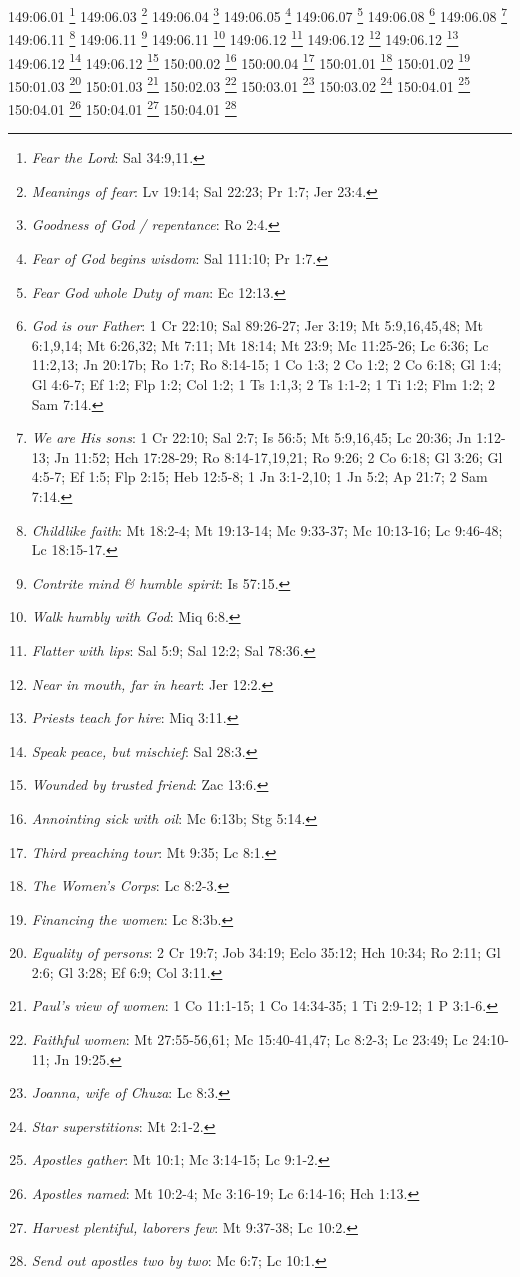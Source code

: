 {{{{{{{{{{{{{{{{{{{{{{{{{{149:06.01 \footnote{\textit{Fear the Lord}: Sal 34:9,11.}
149:06.03 \footnote{\textit{Meanings of fear}: Lv 19:14; Sal 22:23; Pr 1:7; Jer 23:4.}
149:06.04 \footnote{\textit{Goodness of God / repentance}: Ro 2:4.}
149:06.05 \footnote{\textit{Fear of God begins wisdom}: Sal 111:10; Pr 1:7.}
149:06.07 \footnote{\textit{Fear God whole Duty of man}: Ec 12:13.}
149:06.08 \footnote{\textit{God is our Father}: 1 Cr 22:10; Sal 89:26-27; Jer 3:19; Mt 5:9,16,45,48; Mt 6:1,9,14; Mt 6:26,32; Mt 7:11; Mt 18:14; Mt 23:9; Mc 11:25-26; Lc 6:36; Lc 11:2,13; Jn 20:17b; Ro 1:7; Ro 8:14-15; 1 Co 1:3; 2 Co 1:2; 2 Co 6:18; Gl 1:4; Gl 4:6-7; Ef 1:2; Flp 1:2; Col 1:2; 1 Ts 1:1,3; 2 Ts 1:1-2; 1 Ti 1:2; Flm 1:2; 2 Sam 7:14.}
149:06.08 \footnote{\textit{We are His sons}: 1 Cr 22:10; Sal 2:7; Is 56:5; Mt 5:9,16,45; Lc 20:36; Jn 1:12-13; Jn 11:52; Hch 17:28-29; Ro 8:14-17,19,21; Ro 9:26; 2 Co 6:18; Gl 3:26; Gl 4:5-7; Ef 1:5; Flp 2:15; Heb 12:5-8; 1 Jn 3:1-2,10; 1 Jn 5:2; Ap 21:7; 2 Sam 7:14.}
149:06.11 \footnote{\textit{Childlike faith}: Mt 18:2-4; Mt 19:13-14; Mc 9:33-37; Mc 10:13-16; Lc 9:46-48; Lc 18:15-17.}
149:06.11 \footnote{\textit{Contrite mind & humble spirit}: Is 57:15.}
149:06.11 \footnote{\textit{Walk humbly with God}: Miq 6:8.}
149:06.12 \footnote{\textit{Flatter with lips}: Sal 5:9; Sal 12:2; Sal 78:36.}
149:06.12 \footnote{\textit{Near in mouth, far in heart}: Jer 12:2.}
149:06.12 \footnote{\textit{Priests teach for hire}: Miq 3:11.}
149:06.12 \footnote{\textit{Speak peace, but mischief}: Sal 28:3.}
149:06.12 \footnote{\textit{Wounded by trusted friend}: Zac 13:6.}
150:00.02 \footnote{\textit{Annointing sick with oil}: Mc 6:13b; Stg 5:14.}
150:00.04 \footnote{\textit{Third preaching tour}: Mt 9:35; Lc 8:1.}
150:01.01 \footnote{\textit{The Women's Corps}: Lc 8:2-3.}
150:01.02 \footnote{\textit{Financing the women}: Lc 8:3b.}
150:01.03 \footnote{\textit{Equality of persons}: 2 Cr 19:7; Job 34:19; Eclo 35:12; Hch 10:34; Ro 2:11; Gl 2:6; Gl 3:28; Ef 6:9; Col 3:11.}
150:01.03 \footnote{\textit{Paul's view of women}: 1 Co 11:1-15; 1 Co 14:34-35; 1 Ti 2:9-12; 1 P 3:1-6.}
150:02.03 \footnote{\textit{Faithful women}: Mt 27:55-56,61; Mc 15:40-41,47; Lc 8:2-3; Lc 23:49; Lc 24:10-11; Jn 19:25.}
150:03.01 \footnote{\textit{Joanna, wife of Chuza}: Lc 8:3.}
150:03.02 \footnote{\textit{Star superstitions}: Mt 2:1-2.}
150:04.01 \footnote{\textit{Apostles gather}: Mt 10:1; Mc 3:14-15; Lc 9:1-2.}
150:04.01 \footnote{\textit{Apostles named}: Mt 10:2-4; Mc 3:16-19; Lc 6:14-16; Hch 1:13.}
150:04.01 \footnote{\textit{Harvest plentiful, laborers few}: Mt 9:37-38; Lc 10:2.}
150:04.01 \footnote{\textit{Send out apostles two by two}: Mc 6:7; Lc 10:1.}
}}}}}}}}}}}}}}}}}}}}}}}}}}
